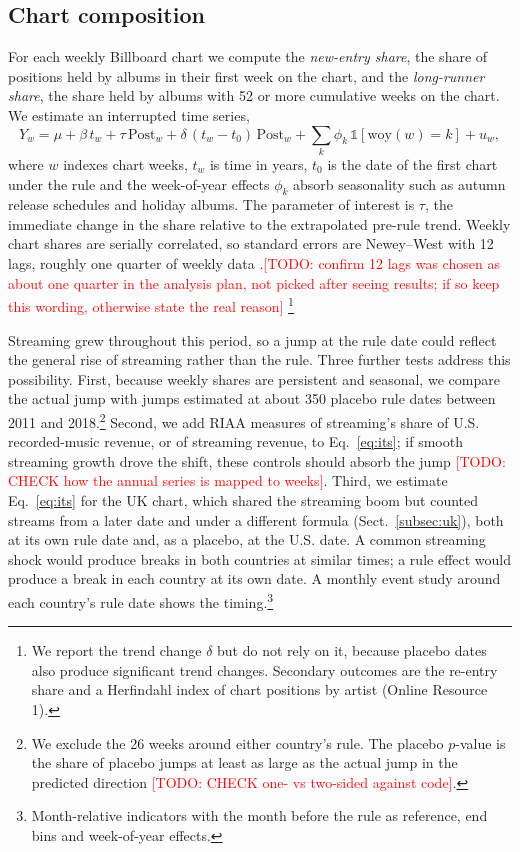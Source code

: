 \documentclass[pdflatex,sn-apa]{sn-jnl}
\newcommand{\todo}[1]{\textcolor{red}{[TODO: #1]}}
\begin{document}
\subsection{Chart composition}\label{subsec:part2}
For each weekly Billboard chart we compute the \emph{new-entry share}, the share of positions held by albums in their first week on the chart, and the \emph{long-runner share}, the share held by albums with 52 or more cumulative weeks on the chart. We estimate an interrupted time series,
\begin{equation}
Y_{w} = \mu + \beta\,t_w + \tau\,\mathrm{Post}_w + \delta\,(t_w - t_0)\,\mathrm{Post}_w + \sum_{k}\phi_k\,\mathbb{1}[\mathrm{woy}(w)=k] + u_w ,
\label{eq:its}
\end{equation}
where $w$ indexes chart weeks, $t_w$ is time in years, $t_0$ is the date of the first chart under the rule and the week-of-year effects $\phi_k$ absorb seasonality such as autumn release schedules and holiday albums. The parameter of interest is $\tau$, the immediate change in the share relative to the extrapolated pre-rule trend. Weekly chart shares are serially correlated, so standard errors are Newey--West with 12 lags, roughly one quarter of weekly data \citep{newey1987simple}.\todo{confirm 12 lags was chosen as about one quarter in the analysis plan, not picked after seeing results; if so keep this wording, otherwise state the real reason} \footnote{We report the trend change $\delta$ but do not rely on it, because placebo dates also produce significant trend changes. Secondary outcomes are the re-entry share and a Herfindahl index of chart positions by artist (Online Resource 1).}

Streaming grew throughout this period, so a jump at the rule date could reflect the general rise of streaming rather than the rule. Three further tests address this possibility. First, because weekly shares are persistent and seasonal, we compare the actual jump with jumps estimated at about 350 placebo rule dates between 2011 and 2018.\footnote{We exclude the 26 weeks around either country's rule. The placebo $p$-value is the share of placebo jumps at least as large as the actual jump in the predicted direction \todo{CHECK one- vs two-sided against code}.} Second, we add RIAA measures of streaming's share of U.S. recorded-music revenue, or of streaming revenue, to Eq.~\eqref{eq:its}; if smooth streaming growth drove the shift, these controls should absorb the jump \todo{CHECK how the annual series is mapped to weeks}. Third, we estimate Eq.~\eqref{eq:its} for the UK chart, which shared the streaming boom but counted streams from a later date and under a different formula (Sect.~\ref{subsec:uk}), both at its own rule date and, as a placebo, at the U.S. date. A common streaming shock would produce breaks in both countries at similar times; a rule effect would produce a break in each country at its own date. A monthly event study around each country's rule date shows the timing.\footnote{Month-relative indicators with the month before the rule as reference, end bins and week-of-year effects.}
\end{document}

